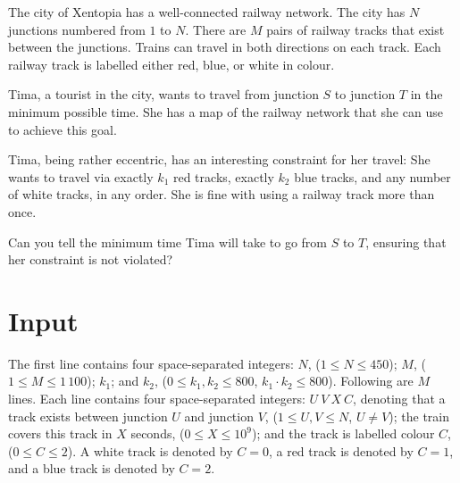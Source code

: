 

The city of Xentopia has a well-connected railway network. The city has $N$ junctions numbered from $1$ to $N$.
There are $M$ pairs of railway tracks that exist between the junctions. Trains can travel in both directions on each track.
Each railway track is labelled either red, blue, or white in colour.

Tima, a tourist in the city, wants to travel from junction $S$ to junction $T$ in the minimum possible time.
She has a map of the railway network that she can use to achieve this goal.

Tima, being rather eccentric, has an interesting constraint for her travel: She wants to travel via exactly $k_1$ red tracks, exactly $k_2$ blue tracks, and any number of white tracks, in any order. She is fine with using a railway track more than once.

Can you tell the minimum time Tima will take to go from $S$ to $T$, ensuring that her constraint is not violated?




\section*{Input}
The first line contains four space-separated integers: $N$, ($1 \leq N \leq 450$); $M$, ($1 \leq M \leq 1\,100$); $k_1$; and $k_2$, ($0 \leq k_1, k_2 \leq 800$, $k_1 \cdot k_2 \leq 800$). Following are $M$ lines. Each line contains four space-separated integers: $U~V~X~C$, denoting that a track exists between junction $U$ and junction $V$, ($1 \leq U, V \leq N$, $U \neq V$); the train covers this track in $X$ seconds, ($0 \leq X \leq 10^9$); and the track is labelled colour $C$, ($0 \leq C \leq 2$). A white track is denoted by $C=0$, a red track is denoted by $C=1$, and a blue track is denoted by $C=2$.

